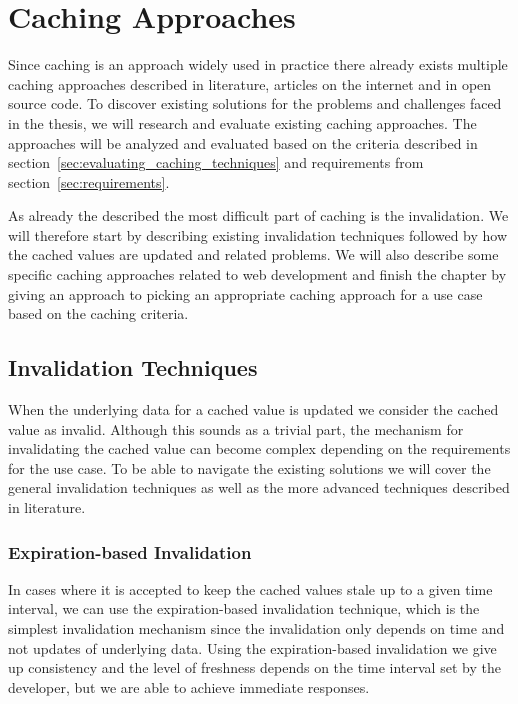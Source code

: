 \chapter{Caching Approaches}
\label{chapter:caching}

Since caching is an approach widely used in practice there already exists multiple caching approaches described in literature, articles on the internet and in open source code. To discover existing solutions for the problems and challenges faced in the thesis, we will research and evaluate existing caching approaches. The approaches will be analyzed and evaluated based on the criteria described in section~\ref{sec:evaluating_caching_techniques} and  requirements from section~\ref{sec:requirements}.

As already the described the most difficult part of caching is the invalidation. We will therefore start by describing existing invalidation techniques followed by how the cached values are updated and related problems. We will also describe some specific caching approaches related to web development and finish the chapter by giving an approach to picking an appropriate caching approach for a use case based on the caching criteria.

\section{Invalidation Techniques}
\label{sec:invalidation_techniques}

When the underlying data for a cached value is updated we consider the cached value as invalid. Although this sounds as a trivial part, the mechanism for invalidating the cached value can become complex depending on the requirements for the use case. To be able to navigate the existing solutions we will cover the general invalidation techniques as well as the more advanced techniques described in literature.


\subsection{Expiration-based Invalidation}
\label{subsec:expiration_based_invalidation}

In cases where it is accepted to keep the cached values stale up to a given time interval, we can use the expiration-based invalidation technique, which is the simplest invalidation mechanism since the invalidation only depends on time and not updates of underlying data. Using the expiration-based invalidation we give up consistency and the level of freshness depends on the time interval set by the developer, but we are able to achieve immediate responses.


